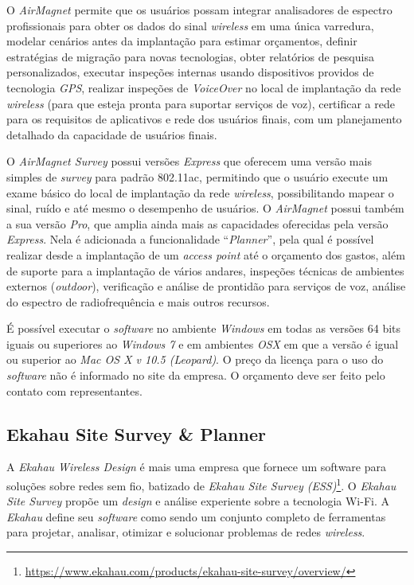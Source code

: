 \documentclass[
	12pt,				%
	twoside,			%
	a4paper,			%
	english,			%
	french,				%
	spanish,			%
	brazil				%
	]{abntex2}
\begin{document}
O \emph{AirMagnet} permite que os usuários possam integrar analisadores
de espectro profissionais para obter os dados do sinal \emph{wireless}
em uma única varredura, modelar cenários antes da implantação para
estimar orçamentos, definir estratégias de migração para novas
tecnologias, obter relatórios de pesquisa personalizados, executar
inspeções internas usando dispositivos providos de tecnologia
\emph{GPS}, realizar inspeções de \emph{VoiceOver} no local de
implantação da rede \emph{wireless} (para que esteja pronta para
suportar serviços de voz), certificar a rede para os requisitos de
aplicativos e rede dos usuários finais, com um planejamento detalhado da
capacidade de usuários finais.

O \emph{AirMagnet Survey} possui versões \emph{Express} que oferecem uma
versão mais simples de \emph{survey} para padrão 802.11ac, permitindo
que o usuário execute um exame básico do local de implantação da rede
\emph{wireless}, possibilitando mapear o sinal, ruído e até mesmo o
desempenho de usuários. O \emph{AirMagnet} possui também a sua versão
\emph{Pro}, que amplia ainda mais as capacidades oferecidas pela versão
\emph{Express}. Nela é adicionada a funcionalidade ``\emph{Planner}'',
pela qual é possível realizar desde a implantação de um \emph{access
point} até o orçamento dos gastos, além de suporte para a implantação de
vários andares, inspeções técnicas de ambientes externos
(\emph{outdoor}), verificação e análise de prontidão para serviços de
voz, análise do espectro de radiofrequência e mais outros recursos.

É possível executar o \emph{software} no ambiente \emph{Windows} em
todas as versões 64 bits iguais ou superiores ao \emph{Windows 7} e em
ambientes \emph{OSX} em que a versão é igual ou superior ao \emph{Mac OS
X v 10.5 (Leopard)}. O preço da licença para o uso do \emph{software}
não é informado no site da empresa. O orçamento deve ser feito pelo
contato com representantes.

\subsection{Ekahau Site Survey \&
Planner}\label{ekahau-site-survey-planner}

A \emph{Ekahau Wireless Design} é mais uma empresa que fornece um
software para soluções sobre redes sem fio, batizado de \emph{Ekahau
Site Survey (ESS)}\footnote{\url{https://www.ekahau.com/products/ekahau-site-survey/overview/}}.
O \emph{Ekahau Site Survey} propõe um \emph{design} e análise experiente
sobre a tecnologia Wi-Fi. A \emph{Ekahau} define seu \emph{software}
como sendo um conjunto completo de ferramentas para projetar, analisar,
otimizar e solucionar problemas de redes \emph{wireless}.
\end{document}
